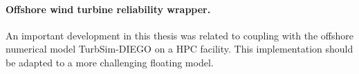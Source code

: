 \paragraph{Offshore wind turbine reliability wrapper.}
An important development in this thesis was related to coupling \ots with the offshore numerical model TurbSim-DIEGO on a HPC facility. 
This implementation should be adapted to a more challenging floating model.